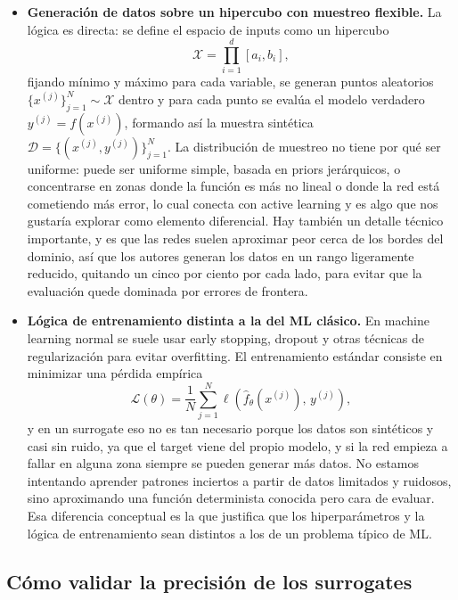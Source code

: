 \documentclass[11pt,a4paper]{article}
\begin{document}
\begin{itemize}
\item \textbf{Generación de datos sobre un hipercubo con muestreo flexible.} La lógica es directa: se define el espacio de inputs como un hipercubo
\begin{equation}
\mathcal{X} = \prod_{i=1}^{d} [a_i, b_i],
\end{equation}
fijando mínimo y máximo para cada variable, se generan puntos aleatorios $\{x^{(j)}\}_{j=1}^{N} \sim \mathcal{X}$ dentro y para cada punto se evalúa el modelo verdadero $y^{(j)} = f(x^{(j)})$, formando así la muestra sintética $\mathcal{D} = \{(x^{(j)}, y^{(j)})\}_{j=1}^{N}$. La distribución de muestreo no tiene por qué ser uniforme: puede ser uniforme simple, basada en priors jerárquicos, o concentrarse en zonas donde la función es más no lineal o donde la red está cometiendo más error, lo cual conecta con active learning y es algo que nos gustaría explorar como elemento diferencial. Hay también un detalle técnico importante, y es que las redes suelen aproximar peor cerca de los bordes del dominio, así que los autores generan los datos en un rango ligeramente reducido, quitando un cinco por ciento por cada lado, para evitar que la evaluación quede dominada por errores de frontera.

\item \textbf{Lógica de entrenamiento distinta a la del ML clásico.} En machine learning normal se suele usar early stopping, dropout y otras técnicas de regularización para evitar overfitting. El entrenamiento estándar consiste en minimizar una pérdida empírica
\begin{equation}
\mathcal{L}(\theta) = \frac{1}{N} \sum_{j=1}^{N} \ell\!\left(\hat{f}_\theta(x^{(j)}),\, y^{(j)}\right),
\end{equation}
y en un surrogate eso no es tan necesario porque los datos son sintéticos y casi sin ruido, ya que el target viene del propio modelo, y si la red empieza a fallar en alguna zona siempre se pueden generar más datos. No estamos intentando aprender patrones inciertos a partir de datos limitados y ruidosos, sino aproximando una función determinista conocida pero cara de evaluar. Esa diferencia conceptual es la que justifica que los hiperparámetros y la lógica de entrenamiento sean distintos a los de un problema típico de ML.
\end{itemize}

\subsection{Cómo validar la precisión de los surrogates}
\end{document}
